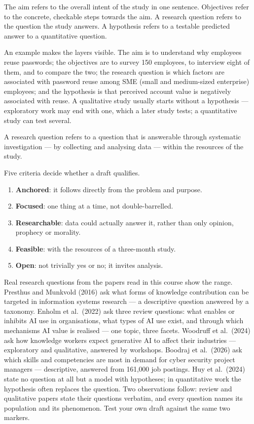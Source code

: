 \documentclass[11pt,a4paper,british,twoside=false,headings=small,chapterprefix=false,numbers=noenddot]{scrbook}
\newenvironment{block}[1]{\begin{tcolorbox}[scriptbox, title={#1}]}{\end{tcolorbox}}
\begin{document}
\begin{block}{Aim, objective, research question, hypothesis}
The aim refers to the overall intent of the study in one sentence. Objectives refer to the concrete, checkable steps towards the aim. A research question refers to the question the study answers. A hypothesis refers to a testable predicted answer to a quantitative question.
\end{block}

An example makes the layers visible. The aim is to understand why employees reuse passwords; the objectives are to survey 150 employees, to interview eight of them, and to compare the two; the research question is which factors are associated with password reuse among SME (small and medium-sized enterprise) employees; and the hypothesis is that perceived account value is negatively associated with reuse. A qualitative study usually starts without a hypothesis --- exploratory work may end with one, which a later study tests; a quantitative study can test several.

\begin{block}{Research question}
A research question refers to a question that is answerable through systematic investigation --- by collecting and analysing data --- within the resources of the study.
\end{block}

Five criteria decide whether a draft qualifies.
\begin{enumerate}
  \item \textbf{Anchored}: it follows directly from the problem and purpose.
  \item \textbf{Focused}: one thing at a time, not double-barrelled.
  \item \textbf{Researchable}: data could actually answer it, rather than only opinion, prophecy or morality.
  \item \textbf{Feasible}: with the resources of a three-month study.
  \item \textbf{Open}: not trivially yes or no; it invites analysis.
\end{enumerate}

Real research questions from the papers read in this course show the range. Presthus and Munkvold (2016) ask what forms of knowledge contribution can be targeted in information systems research --- a descriptive question answered by a taxonomy. Enholm et al.\ (2022) ask three review questions: what enables or inhibits AI use in organisations, what types of AI use exist, and through which mechanisms AI value is realised --- one topic, three facets. Woodruff et al.\ (2024) ask how knowledge workers expect generative AI to affect their industries --- exploratory and qualitative, answered by workshops. Boodraj et al.\ (2026) ask which skills and competencies are most in demand for cyber security project managers --- descriptive, answered from 161,000 job postings. Huy et al.\ (2024) state no question at all but a model with hypotheses; in quantitative work the hypothesis often replaces the question. Two observations follow: review and qualitative papers state their questions verbatim, and every question names its population and its phenomenon. Test your own draft against the same two markers.
\end{document}
